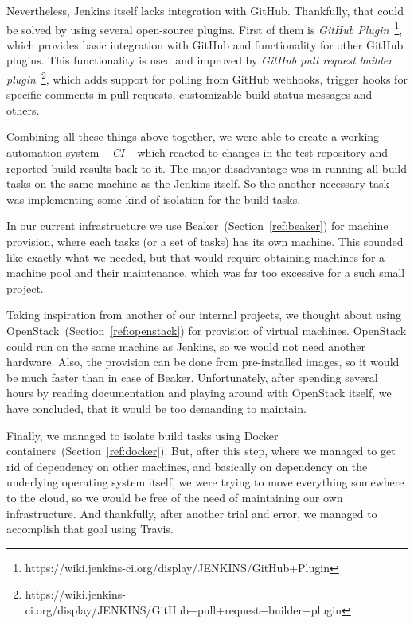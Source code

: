     Nevertheless, Jenkins itself lacks integration with GitHub. Thankfully, that
    could be solved by using several open-source plugins. First of them is
    \textit{GitHub Plugin}~\footnote{https://wiki.jenkins-ci.org/display/JENKINS/GitHub+Plugin},
    which provides basic integration with GitHub and functionality for other
    GitHub plugins. This functionality is used and improved by
    \textit{GitHub pull request builder plugin}~\footnote{https://wiki.jenkins-ci.org/display/JENKINS/GitHub+pull+request+builder+plugin},
    which adds support for polling from GitHub webhooks, trigger hooks for
    specific comments in pull requests, customizable build status messages and
    others.

    Combining all these things above together, we were able to create a working
    automation system -- \textit{CI} -- which reacted to changes in the test
    repository and reported build results back to it. The major disadvantage
    was in running all build tasks on the same machine as the Jenkins itself.
    So the another necessary task was implementing some kind of isolation
    for the build tasks.

    In our current infrastructure we use Beaker~(Section~\ref{ref:beaker}) for machine
    provision, where each tasks (or a set of tasks) has its own machine. This sounded like exactly
    what we needed, but that would require obtaining machines for a machine pool
    and their maintenance, which was far too excessive for a such small project.

    Taking inspiration from another of our internal projects, we thought about
    using OpenStack~(Section~\ref{ref:openstack}) for provision of virtual
    machines. OpenStack could run on the same machine as Jenkins, so we would not
    need another hardware. Also, the provision can be done from pre-installed
    images, so it would be much faster than in case of Beaker. Unfortunately,
    after spending several hours by reading documentation and playing around with
    OpenStack itself, we have concluded, that it would be too demanding
    to maintain.

    Finally, we managed to isolate build tasks using Docker containers~(Section~\ref{ref:docker}).
    But, after this step, where we managed to get rid of dependency on other machines,
    and basically on dependency on the underlying operating system itself, we
    were trying to move everything somewhere to the cloud, so we would be free
    of the need of maintaining our own infrastructure. And thankfully, after
    another trial and error, we managed to accomplish that goal using Travis.

